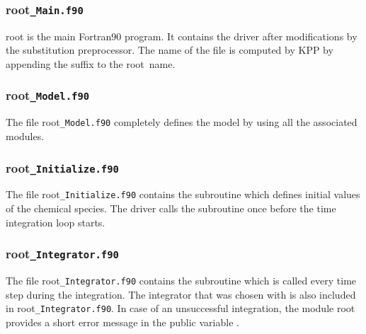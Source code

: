 \documentclass[twoside]{article}
\newcommand{\kpproot}{{\sc root}}
\begin{document}
\subsubsection{\kpproot{\tt\_Main.f90}}
\label{sec:output-main}

\kpproot{} is the main Fortran90 program. It contains the
driver after modifications by the substitution preprocessor. The name of
the file is computed by KPP by appending the suffix 
to the \kpproot\ name.

\subsubsection{\kpproot{\tt\_Model.f90}}
\label{sec:output-model}

The file \kpproot{\tt\_Model.f90} completely defines the model by using
all the associated modules.

\subsubsection{\kpproot{\tt\_Initialize.f90}}
\label{sec:output-init}

The file \kpproot{\tt\_Initialize.f90} contains the subroutine 
which defines initial values of the chemical species. The driver calls
the subroutine  once before the time integration loop
starts.

\subsubsection{\kpproot{\tt\_Integrator.f90}}
\label{sec:output-integrator}

The file \kpproot{\tt\_Integrator.f90} contains the subroutine
 which is called every time step during the integration.
The integrator that was chosen with  is also included
in \kpproot{\tt\_Integrator.f90}. In case of an unsuccessful
integration, the module \kpproot{} provides a short
error message in the public variable .
\end{document}
